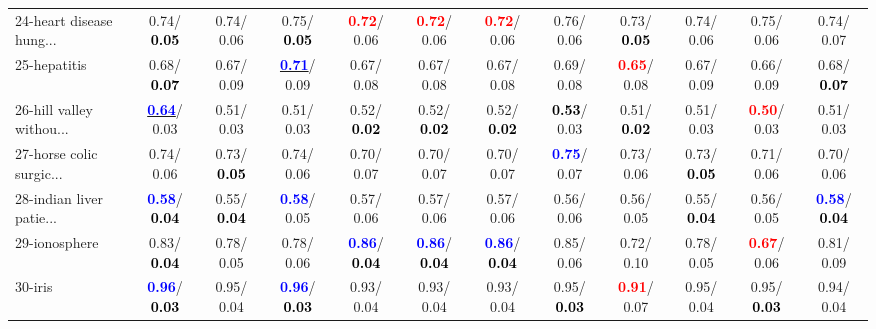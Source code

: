 \begin{table}[h]
\begin{center}
{\begin{tabular}{lc|c|c|c|c|c|c|c|c|c|c}
24-heart disease hung... &   0.74/\textcolor{black}{\textbf{  0.05}} &   0.74/  0.06 &   0.75/\textcolor{black}{\textbf{  0.05}} & \textcolor{red}{\textbf{  0.72}}/  0.06 & \textcolor{red}{\textbf{  0.72}}/  0.06 & \textcolor{red}{\textbf{  0.72}}/  0.06 &   0.76/  0.06 &   0.73/\textcolor{black}{\textbf{  0.05}} &   0.74/  0.06 &   0.75/  0.06 &   0.74/  0.07 \\
25-hepatitis &   0.68/\textcolor{black}{\textbf{  0.07}} &   0.67/  0.09 & \underline{\textcolor{blue}{\textbf{  0.71}}}/  0.09 &   0.67/  0.08 &   0.67/  0.08 &   0.67/  0.08 &   0.69/  0.08 & \textcolor{red}{\textbf{  0.65}}/  0.08 &   0.67/  0.09 &   0.66/  0.09 &   0.68/\textcolor{black}{\textbf{  0.07}} \\
26-hill valley withou... & \underline{\textcolor{blue}{\textbf{  0.64}}}/  0.03 &   0.51/  0.03 &   0.51/  0.03 &   0.52/\textcolor{black}{\textbf{  0.02}} &   0.52/\textcolor{black}{\textbf{  0.02}} &   0.52/\textcolor{black}{\textbf{  0.02}} & \textcolor{black}{\textbf{  0.53}}/  0.03 &   0.51/\textcolor{black}{\textbf{  0.02}} &   0.51/  0.03 & \textcolor{red}{\textbf{  0.50}}/  0.03 &   0.51/  0.03 \\
27-horse colic surgic... &   0.74/  0.06 &   0.73/\textcolor{black}{\textbf{  0.05}} &   0.74/  0.06 &   0.70/  0.07 &   0.70/  0.07 &   0.70/  0.07 & \textcolor{blue}{\textbf{  0.75}}/  0.07 &   0.73/  0.06 &   0.73/\textcolor{black}{\textbf{  0.05}} &   0.71/  0.06 &   0.70/  0.06 \\
28-indian liver patie... & \textcolor{blue}{\textbf{  0.58}}/\textcolor{black}{\textbf{  0.04}} &   0.55/\textcolor{black}{\textbf{  0.04}} & \textcolor{blue}{\textbf{  0.58}}/  0.05 &   0.57/  0.06 &   0.57/  0.06 &   0.57/  0.06 &   0.56/  0.06 &   0.56/  0.05 &   0.55/\textcolor{black}{\textbf{  0.04}} &   0.56/  0.05 & \textcolor{blue}{\textbf{  0.58}}/\textcolor{black}{\textbf{  0.04}} \\ \hline
29-ionosphere &   0.83/\textcolor{black}{\textbf{  0.04}} &   0.78/  0.05 &   0.78/  0.06 & \textcolor{blue}{\textbf{  0.86}}/\textcolor{black}{\textbf{  0.04}} & \textcolor{blue}{\textbf{  0.86}}/\textcolor{black}{\textbf{  0.04}} & \textcolor{blue}{\textbf{  0.86}}/\textcolor{black}{\textbf{  0.04}} &   0.85/  0.06 &   0.72/  0.10 &   0.78/  0.05 & \textcolor{red}{\textbf{  0.67}}/  0.06 &   0.81/  0.09 \\
30-iris & \textcolor{blue}{\textbf{  0.96}}/\textcolor{black}{\textbf{  0.03}} &   0.95/  0.04 & \textcolor{blue}{\textbf{  0.96}}/\textcolor{black}{\textbf{  0.03}} &   0.93/  0.04 &   0.93/  0.04 &   0.93/  0.04 &   0.95/\textcolor{black}{\textbf{  0.03}} & \textcolor{red}{\textbf{  0.91}}/  0.07 &   0.95/  0.04 &   0.95/\textcolor{black}{\textbf{  0.03}} &   0.94/  0.04 \\

\end{tabular}}
\end{center}
\end{table}
